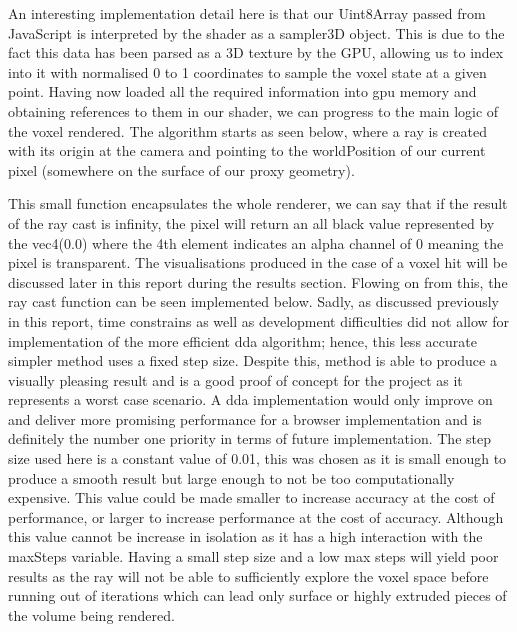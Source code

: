 \documentclass[titlepage]{article}
\begin{document}



An interesting implementation detail here is that our Uint8Array passed from JavaScript is interpreted by the shader as a sampler3D object. This is due to the fact this data has been parsed as a 3D texture by the GPU, allowing us to index into it with normalised 0 to 1 coordinates to sample the voxel state at a given point. Having now loaded all the required information into \gls{gpu} memory and obtaining references to them in our shader, we can progress to the main logic of the voxel rendered. The algorithm starts as seen below, where a ray is created with its origin at the camera and pointing to the worldPosition of our current pixel (somewhere on the surface of our proxy geometry).



This small function encapsulates the whole renderer, we can say that if the result of the ray cast is infinity, the pixel will return an all black value represented by the vec4(0.0) where the 4th element indicates an alpha channel of 0 meaning the pixel is transparent. The visualisations produced in the case of a voxel hit will be discussed later in this report during the results section. Flowing on from this, the ray cast function can be seen implemented below. Sadly, as discussed previously in this report, time constrains as well as development difficulties did not allow for implementation of the more efficient \gls{dda} algorithm; hence, this less accurate simpler method uses a fixed step size. Despite this, method is able to produce a visually pleasing result and is a good proof of concept for the project as it represents a worst case scenario. A \gls{dda} implementation would only improve on and deliver more promising performance for a browser implementation and is definitely the number one priority in terms of future implementation. The step size used here is a constant value of 0.01, this was chosen as it is small enough to produce a smooth result but large enough to not be too computationally expensive. This value could be made smaller to increase accuracy at the cost of performance, or larger to increase performance at the cost of accuracy. Although this value cannot be increase in isolation as it has a high interaction with the maxSteps variable. Having a small step size and a low max steps will yield poor results as the ray will not be able to sufficiently explore the voxel space before running out of iterations which can lead only surface or highly extruded pieces of the volume being rendered.
\end{document}
